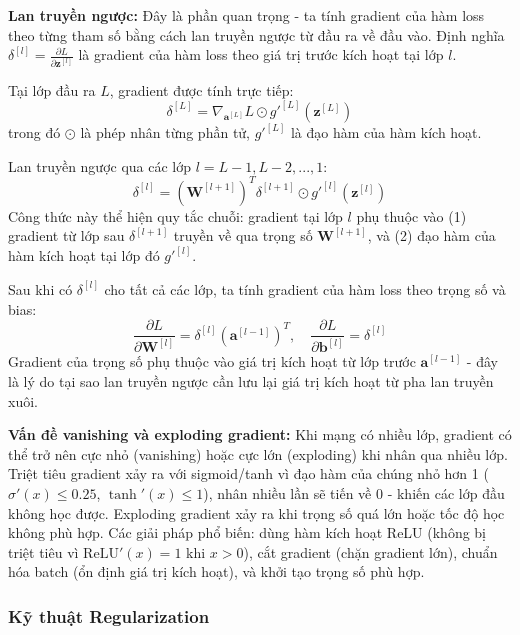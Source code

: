 \textbf{Lan truyền ngược:} Đây là phần quan trọng - ta tính gradient của hàm loss theo từng tham số bằng cách lan truyền ngược từ đầu ra về đầu vào. Định nghĩa $\delta^{[l]} = \frac{\partial L}{\partial \mathbf{z}^{[l]}}$ là gradient của hàm loss theo giá trị trước kích hoạt tại lớp $l$.

Tại lớp đầu ra $L$, gradient được tính trực tiếp:
\begin{equation}
\delta^{[L]} = \nabla_{\mathbf{a}^{[L]}} L \odot g'^{[L]}(\mathbf{z}^{[L]})
\end{equation}
trong đó $\odot$ là phép nhân từng phần tử, $g'^{[L]}$ là đạo hàm của hàm kích hoạt.

Lan truyền ngược qua các lớp $l = L-1, L-2, ..., 1$:
\begin{equation}
\delta^{[l]} = (\mathbf{W}^{[l+1]})^T \delta^{[l+1]} \odot g'^{[l]}(\mathbf{z}^{[l]})
\end{equation}
Công thức này thể hiện quy tắc chuỗi: gradient tại lớp $l$ phụ thuộc vào (1) gradient từ lớp sau $\delta^{[l+1]}$ truyền về qua trọng số $\mathbf{W}^{[l+1]}$, và (2) đạo hàm của hàm kích hoạt tại lớp đó $g'^{[l]}$.

Sau khi có $\delta^{[l]}$ cho tất cả các lớp, ta tính gradient của hàm loss theo trọng số và bias:
\begin{equation}
\frac{\partial L}{\partial \mathbf{W}^{[l]}} = \delta^{[l]} (\mathbf{a}^{[l-1]})^T, \quad \frac{\partial L}{\partial \mathbf{b}^{[l]}} = \delta^{[l]}
\end{equation}
Gradient của trọng số phụ thuộc vào giá trị kích hoạt từ lớp trước $\mathbf{a}^{[l-1]}$ - đây là lý do tại sao lan truyền ngược cần lưu lại giá trị kích hoạt từ pha lan truyền xuôi.

\textbf{Vấn đề vanishing và exploding gradient:} Khi mạng có nhiều lớp, gradient có thể trở nên cực nhỏ (vanishing) hoặc cực lớn (exploding) khi nhân qua nhiều lớp. Triệt tiêu gradient xảy ra với sigmoid/tanh vì đạo hàm của chúng nhỏ hơn 1 ($\sigma'(x) \leq 0.25$, $\tanh'(x) \leq 1$), nhân nhiều lần sẽ tiến về 0 - khiến các lớp đầu không học được. Exploding gradient xảy ra khi trọng số quá lớn hoặc tốc độ học không phù hợp. Các giải pháp phổ biến: dùng hàm kích hoạt ReLU (không bị triệt tiêu vì $\text{ReLU}'(x) = 1$ khi $x > 0$), cắt gradient (chặn gradient lớn), chuẩn hóa batch (ổn định giá trị kích hoạt), và khởi tạo trọng số phù hợp.

\subsubsection{Kỹ thuật Regularization}

